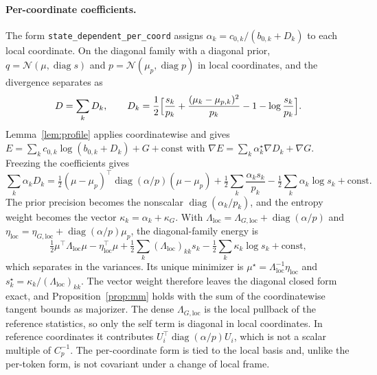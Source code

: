 \documentclass[11pt]{article}
\theoremstyle{definition}
\theoremstyle{remark}
\newcommand{\diag}{\operatorname{diag}}
\newcommand{\N}{\mathcal{N}}
\newcommand{\cfg}[1]{\texttt{#1}}
\begin{document}
\paragraph{Per-coordinate coefficients.}
The form \cfg{state\_dependent\_per\_coord} assigns $\alpha_k=c_{0,k}/(b_{0,k}+D_k)$ to each local coordinate. On the diagonal family with a diagonal prior, $q=\N(\mu,\diag s)$ and $p=\N(\mu_p,\diag p)$ in local coordinates, and the divergence separates as
\begin{equation}
D=\sum_kD_k,\qquad D_k=\frac12\Bigl[\frac{s_k}{p_k}+\frac{(\mu_k-\mu_{p,k})^2}{p_k}-1-\log\frac{s_k}{p_k}\Bigr].
\end{equation}
Lemma~\ref{lem:profile} applies coordinatewise and gives $E=\sum_kc_{0,k}\log(b_{0,k}+D_k)+G+\text{const}$ with $\nabla E=\sum_k\alpha_k^\star\nabla D_k+\nabla G$. Freezing the coefficients gives
\begin{equation}
\sum_k\alpha_kD_k=\tfrac12(\mu-\mu_p)^\top\diag(\alpha/p)(\mu-\mu_p)+\tfrac12\sum_k\frac{\alpha_ks_k}{p_k}-\tfrac12\sum_k\alpha_k\log s_k+\text{const}.
\end{equation}
The prior precision becomes the nonscalar $\diag(\alpha_k/p_k)$, and the entropy weight becomes the vector $\kappa_k=\alpha_k+\kappa_G$. With $\Lambda_{\mathrm{loc}}=\Lambda_{G,\mathrm{loc}}+\diag(\alpha/p)$ and $\eta_{\mathrm{loc}}=\eta_{G,\mathrm{loc}}+\diag(\alpha/p)\mu_p$, the diagonal-family energy is
\begin{equation}
\tfrac12\mu^\top\Lambda_{\mathrm{loc}}\mu-\eta_{\mathrm{loc}}^\top\mu+\tfrac12\sum_k(\Lambda_{\mathrm{loc}})_{kk}s_k-\tfrac12\sum_k\kappa_k\log s_k+\text{const},
\end{equation}
which separates in the variances. Its unique minimizer is $\mu^\star=\Lambda_{\mathrm{loc}}^{-1}\eta_{\mathrm{loc}}$ and $s_k^\star=\kappa_k/(\Lambda_{\mathrm{loc}})_{kk}$. The vector weight therefore leaves the diagonal closed form exact, and Proposition~\ref{prop:mm} holds with the sum of the coordinatewise tangent bounds as majorizer. The dense $\Lambda_{G,\mathrm{loc}}$ is the local pullback of the reference statistics, so only the self term is diagonal in local coordinates. In reference coordinates it contributes $U_i^\top\diag(\alpha/p)U_i$, which is not a scalar multiple of $C_p^{-1}$. The per-coordinate form is tied to the local basis and, unlike the per-token form, is not covariant under a change of local frame.
\end{document}
